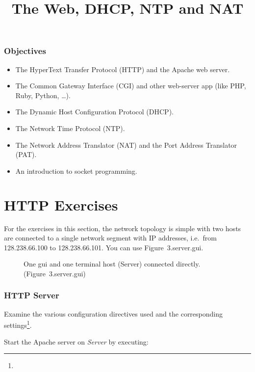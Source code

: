 \documentclass{UTNetLab}
\title{The Web, DHCP, NTP and NAT}
\begin{document}
	\section*{Objectives}
	\begin{itemize}
		\item The HyperText Transfer Protocol (HTTP) and the Apache web server.
		\item The Common Gateway Interface (CGI) and other web-server app (like PHP, Ruby, Python, \dots).
		\item The Dynamic Host Configuration Protocol (DHCP).
		\item The Network Time Protocol (NTP).
		\item The Network Address Translator (NAT) and the Port Address Translator (PAT).
		\item [-] An introduction to socket programming.
	\end{itemize}
\part{HTTP Exercises}
For the exercises in this section, the network topology is simple with two hosts are connected to a single network segment with IP addresses, i.e.\  from 128.238.66.100 to 128.238.66.101.
You can use {Figure~3.server.gui}.
    
    \begin{figure}[H]
    	\centering
    	\caption{One gui and one terminal host (Server) connected directly. (Figure~3.server.gui)}
    	\label{fig:two-gui}
    \end{figure}

\section{HTTP Server}
   Examine the various configuration directives used and the corresponding settings\footnote{}.
   
   Start the Apache server on  \textit{Server} by executing: 
       
\end{document}
